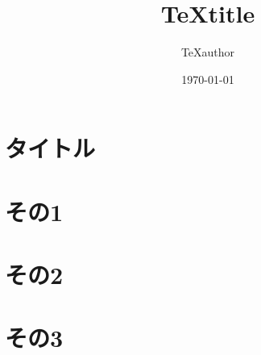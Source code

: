 \documentclass[dvipdfmx]{beamer}
\title[footline title]{
\texorpdfstring{
\TeX title
}{
Bookmark title
}}
\author[footline author]{
\texorpdfstring{
\TeX author
}{
Bookmark author
}}
\institute[footline institute]{
\texorpdfstring{
\TeX institute
}{
Bookmark institute
}}
\date{\today}
\begin{document}
\section[]{タイトル}
\frame{\titlepage}

\section{その1}

\section{その2}

\section{その3}
\end{document}
